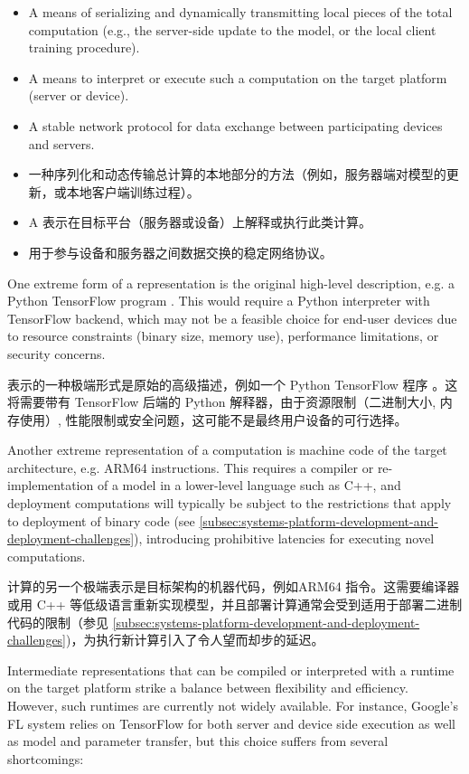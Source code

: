 \begin{itemize}
    \item A means of serializing and dynamically transmitting local pieces of the total computation (e.g., the server-side update to the model, or the local client training procedure).
    \item A means to interpret or execute such a computation on the target platform (server or device).
    \item A stable network protocol for data exchange between participating devices and servers.
    \item 一种序列化和动态传输总计算的本地部分的方法（例如，服务器端对模型的更新，或本地客户端训练过程）。
    \item A 表示在目标平台（服务器或设备）上解释或执行此类计算。
    \item 用于参与设备和服务器之间数据交换的稳定网络协议。
\end{itemize}

One extreme form of a representation is the original high-level description, e.g. a Python TensorFlow program \citep{tensorflow2015-whitepaper}. This would require a Python interpreter with TensorFlow backend, which may not be a feasible choice for end-user devices due to resource constraints (binary size, memory use), performance limitations, or security concerns.

表示的一种极端形式是原始的高级描述，例如一个 Python TensorFlow 程序 \citep{tensorflow2015-whitepaper}。这将需要带有 TensorFlow 后端的 Python 解释器，由于资源限制（二进制大小, 内存使用）, 性能限制或安全问题，这可能不是最终用户设备的可行选择。

Another extreme representation of a computation is machine code of the target architecture, e.g. ARM64 instructions. This requires a compiler or re-implementation of a model in a lower-level language such as C++, and deployment computations will typically be subject to the restrictions that apply to deployment of binary code (see \cref{subsec:systems-platform-development-and-deployment-challenges}), introducing prohibitive latencies for executing novel computations.

计算的另一个极端表示是目标架构的机器代码，例如ARM64 指令。这需要编译器或用 C++ 等低级语言重新实现模型，并且部署计算通常会受到适用于部署二进制代码的限制（参见 \cref{subsec:systems-platform-development-and-deployment-challenges})，为执行新计算引入了令人望而却步的延迟。

Intermediate representations that can be compiled or interpreted with a runtime on the target platform strike a balance between flexibility and efficiency. However, such runtimes are currently not widely available. For instance, Google’s FL system \citep{bonawitz19sysml} relies on TensorFlow for both server and device side execution as well as model and parameter transfer, but this choice suffers from several shortcomings:


